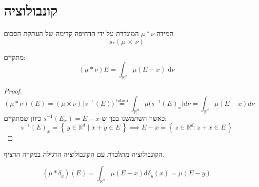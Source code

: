 \documentclass{tstextbook}
\begin{document}
\section{קונבולוציה}

\begin{definition}[קונבולוציה]
המידה \(\mu*\nu\) המוגדרת על ידי הדחיפה קדימה של העתקת הסכום
$$ s_{\ast}\left(\mu\,\times\,\nu\right)$$

\end{definition}
\begin{proposition}
מתקיים:
$$\left( \mu*\nu \right)E=\int _{\mathbb{R}^{d}}\mu(E-x) \;\mathrm{d} \nu $$

\end{proposition}
\begin{proof}
$$(\mu*\nu)(E)=(\mu\times\nu)\bigl(s^{-1}(E)\bigr)\stackrel{\text{fubini}}{=}\int_{\mathbb{R}^{d}}\mu\bigl(s^{-1}(E)_{x}\bigr)d\nu=\int_{\mathbb{R}^{d}}\mu(E-x)d\nu$$
כאשר השתמשנו בכך ש-\(s ^{-1}(E_{x})=E-x\) כיוון שמתקיים:
$$s^{-1}(E)_{x}=\left\{ \,y\in\mathbb{R}^{d}\mid x+y\in E\, \right\}\implies E-x=\left\{ \,z\in\mathbb{R}^{d}:z+x\in E\, \right\}$$

\end{proof}
\begin{remark}
הקונבולוציה מתלכדת עם הקונבולוציה הרגילה במקרה הרציף.

\end{remark}
\begin{proposition}
$$\left( \mu*\delta_{y} \right)(E)=\int_{\mathbb{R}^{d}}\mu(E-x)\mathrm{d}\delta_{y}(x)=\mu(E-y)$$

\end{proposition}
\end{document}
